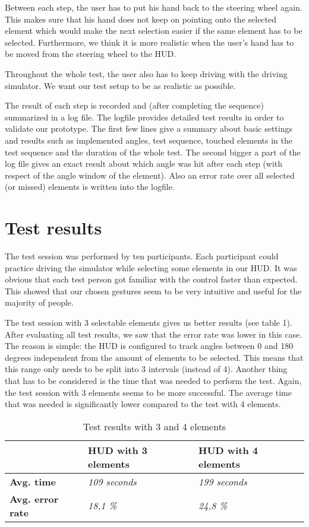 \documentclass{sigchi-ext}
\begin{document}
Between each step, the user has to put his hand back to the steering wheel again. This makes sure that his hand does not keep on pointing onto the selected element which would make the next selection easier if the same element has to be selected. Furthermore, we think it is more realistic when the user's hand has to be moved from the steering wheel to the HUD.

Throughout the whole test, the user also has to keep driving with the driving simulator. We want our test setup to be as realistic as possible. 

The result of each step is recorded and (after completing the sequence) summarized in a log file. The logfile provides detailed test results in order to validate our prototype. The first few lines give a summary about basic settings and results such as implemented angles, test sequence, touched elements in the test sequence and the duration of the whole test. The second bigger a part of the log file gives an exact result about which angle was hit after each step (with respect of the angle window of the element). Also an error rate over all selected (or missed) elements is written into the logfile.

\section{Test results}
The test session was performed by ten participants.  Each participant could practice driving the simulator while selecting some elements in our HUD. It was obvious that each test person got familiar with the control faster than expected. This showed that our chosen gestures seem to be very intuitive and useful for the majority of people.

The test session with 3 selectable elements gives us better results (see table 1). After evaluating all test results, we saw that the error rate was lower in this case. The reason is simple: the HUD is configured to track angles between 0 and 180 degrees independent from the amount of elements to be selected. This means that this range only needs to be split into 3 intervals (instead of 4). Another thing that has to be considered is the time that was needed to perform the test. Again, the test session with 3 elements seems to be more successful. The average time that was needed is significantly lower compared to the test with 4 elements. 

\begin{table}
\begin{tabular}{|l|l|l|}
\hline
  & \textbf{HUD with 3 elements} & \textbf{HUD with 4 elements} \\
\hline
\textbf{Avg. time} & \textit{109 seconds} & \textit{199 seconds} \\
\hline
\textbf{Avg. error rate} & \textit{18,1 \%} & \textit{24,8 \%} \\
\hline
\end{tabular}
\caption{Test results with 3 and 4 elements}
\end{table}
\end{document}
